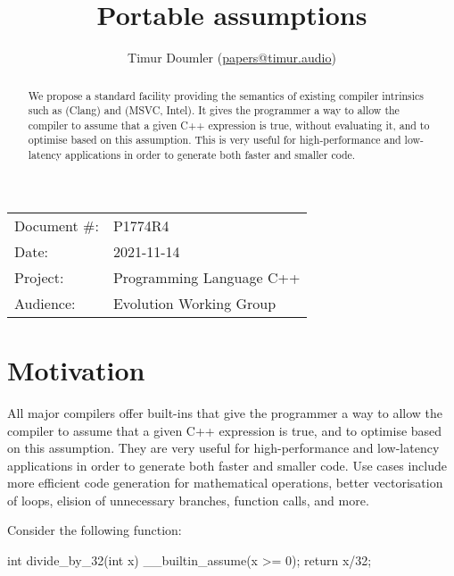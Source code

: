 

\newcommand{\forceindent}{\parindent=1em\indent\parindent=0pt\relax} %


\title{Portable assumptions}
\author{
  Timur Doumler \small(\href{mailto:papers@timur.audio}{papers@timur.audio})
}
\date{}
\maketitle

\begin{tabular}{ll}
Document \#: & P1774R4 \\
Date: & 2021-11-14\\
Project: & Programming Language C++ \\
Audience: & Evolution Working Group
\end{tabular}


\begin{abstract}
We propose a standard facility providing the semantics of existing compiler intrinsics such as  (Clang) and  (MSVC, Intel). It gives the programmer a way to allow the compiler to assume that a given C++ expression is true, without evaluating it, and to optimise based on this assumption. This is very useful for high-performance and low-latency applications in order to generate both faster and smaller code.
\end{abstract}

\vspace{5mm}

\section{Motivation}

All major compilers offer built-ins that give the programmer a way to allow the compiler to assume that a given C++ expression is true, and to optimise based on this assumption. They are very useful for high-performance and low-latency applications in order to generate both faster and smaller code. Use cases include more efficient code generation for mathematical operations, better vectorisation of loops, elision of unnecessary branches, function calls, and more.

Consider the following function:

\begin{codeblock}
int divide_by_32(int x) 
{
  __builtin_assume(x >= 0);
  return x/32;
}
\end{codeblock}

